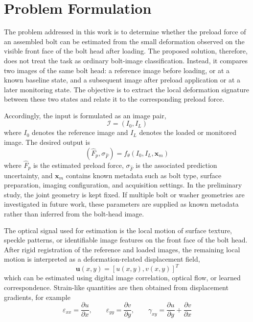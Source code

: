 \section{Problem Formulation}
The problem addressed in this work is to determine whether the preload force of an assembled bolt can be estimated from the small deformation observed on the visible front face of the bolt head after loading. The proposed solution, therefore, does not treat the task as ordinary bolt-image classification. Instead, it compares two images of the same bolt head: a reference image before loading, or at a known baseline state, and a subsequent image after preload application or at a later monitoring state. The objective is to extract the local deformation signature between these two states and relate it to the corresponding preload force.

Accordingly, the input is formulated as an image pair,
\begin{equation}
    \mathcal{I}=\left(I_0,I_L\right)
    \label{eq:image-pair input}
\end{equation}
where $I_0$ denotes the reference image and $I_L$ denotes the loaded or monitored image. The desired output is
\begin{equation}
    \left(\hat{F}_p,\sigma_{\hat{F}}\right)=f_\theta\left(I_0,I_L,\mathbf{x}_m\right)
    \label{eq:mapping}
\end{equation}
where $\hat{F}_p$ is the estimated preload force, $\sigma_{\hat{F}}$ is the associated prediction uncertainty, and $\mathbf{x}_m$ contains known metadata such as bolt type, surface preparation, imaging configuration, and acquisition settings. In the preliminary study, the joint geometry is kept fixed. If multiple bolt or washer geometries are investigated in future work, these parameters are supplied as known metadata rather than inferred from the bolt-head image.

The optical signal used for estimation is the local motion of surface texture, speckle patterns, or identifiable image features on the front face of the bolt head. After rigid registration of the reference and loaded images, the remaining local motion is interpreted as a deformation-related displacement field,
\begin{equation}
    \mathbf{u}(x,y)=\left[u(x,y),v(x,y)\right]^T
    \label{eq:displacment}
\end{equation}
which can be estimated using digital image correlation, optical flow, or learned correspondence. Strain-like quantities are then obtained from displacement gradients, for example
\begin{equation}
    \varepsilon_{xx}=\frac{\partial u}{\partial x},\qquad
    \varepsilon_{yy}=\frac{\partial v}{\partial y},\qquad
    \gamma_{xy}=\frac{\partial u}{\partial y}+\frac{\partial v}{\partial x}
    \label{eq:strain from displacement gradients}
\end{equation}

